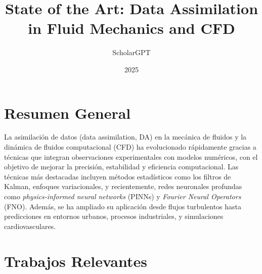 \documentclass[12pt]{article}
\title{State of the Art: Data Assimilation in Fluid Mechanics and CFD}
\author{ScholarGPT}
\date{2025}
\begin{document}
\maketitle

\section*{Resumen General}

La asimilación de datos (data assimilation, DA) en la mecánica de fluidos y la dinámica de fluidos computacional (CFD) ha evolucionado rápidamente gracias a técnicas que integran observaciones experimentales con modelos numéricos, con el objetivo de mejorar la precisión, estabilidad y eficiencia computacional. Las técnicas más destacadas incluyen métodos estadísticos como los filtros de Kalman, enfoques variacionales, y recientemente, redes neuronales profundas como \textit{physics-informed neural networks} (PINNs) y \textit{Fourier Neural Operators} (FNO). Además, se ha ampliado su aplicación desde flujos turbulentos hasta predicciones en entornos urbanos, procesos industriales, y simulaciones cardiovasculares.

\section*{Trabajos Relevantes}
\end{document}
